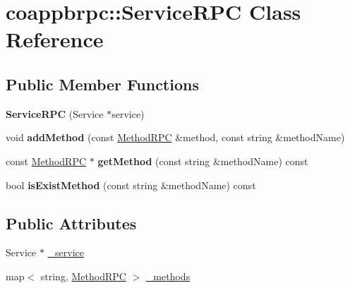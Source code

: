 \hypertarget{classcoappbrpc_1_1ServiceRPC}{}\section{coappbrpc\+:\+:Service\+R\+PC Class Reference}
\label{classcoappbrpc_1_1ServiceRPC}
\subsection*{Public Member Functions}
\begin{DoxyCompactItemize}
\item 
\mbox{\label{classcoappbrpc_1_1ServiceRPC_a8f42df8ccafc5b375087e9900f761423}} 
{\bfseries Service\+R\+PC} (Service $\ast$service)
\item 
\mbox{\label{classcoappbrpc_1_1ServiceRPC_a849b466a1822ce208341ee6fe77caa50}} 
void {\bfseries add\+Method} (const \hyperlink{classcoappbrpc_1_1MethodRPC}{Method\+R\+PC} \&method, const string \&method\+Name)
\item 
\mbox{\label{classcoappbrpc_1_1ServiceRPC_a8487c0439e8e8ac9b13568d584b2e453}} 
const \hyperlink{classcoappbrpc_1_1MethodRPC}{Method\+R\+PC} $\ast$ {\bfseries get\+Method} (const string \&method\+Name) const
\item 
\mbox{\label{classcoappbrpc_1_1ServiceRPC_ada0589f327daf276f1ab2f26c1a281ca}} 
bool {\bfseries is\+Exist\+Method} (const string \&method\+Name) const
\end{DoxyCompactItemize}
\subsection*{Public Attributes}
\begin{DoxyCompactItemize}
\item 
Service $\ast$ \hyperlink{classcoappbrpc_1_1ServiceRPC_a76e56a923f37cdf78b671f912f90ade0}{\+\_\+service}
\item 
map$<$ string, \hyperlink{classcoappbrpc_1_1MethodRPC}{Method\+R\+PC} $>$ \hyperlink{classcoappbrpc_1_1ServiceRPC_a78c4046e1763ce1e79d372f8531e3cea}{\+\_\+methods}
\end{DoxyCompactItemize}


